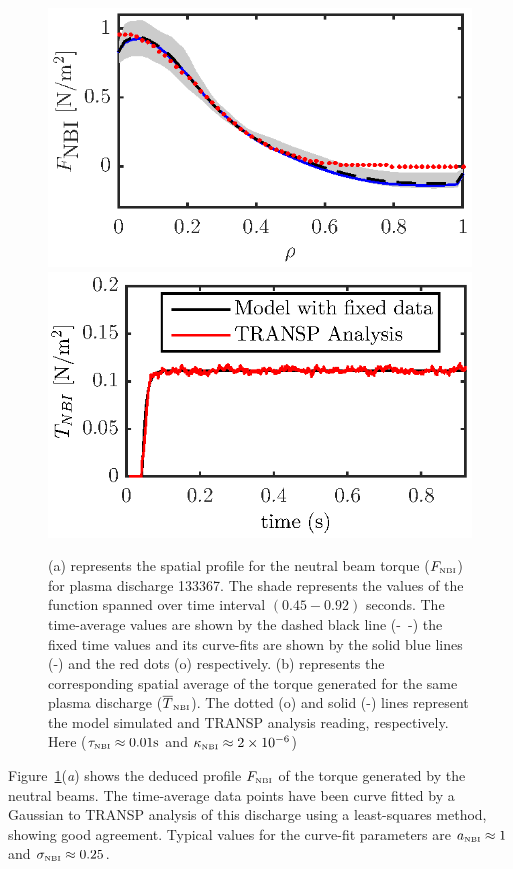 \documentclass[12pt]{iopart}
\begin{document}
\begin{figure}
\includegraphics{imene_figs/fig4a} \hspace{-2.7em} \\[-1em] %
\includegraphics{imene_figs/fig4b} \hspace{-2.7em}          %
\caption{(a) represents the spatial profile for the neutral beam torque ($F_\textrm{\tiny{NBI}} $) for plasma discharge 133367.  The shade represents the values of the function spanned over time interval $(0.45-0.92)$ seconds.  The time-average values are shown by the dashed black line (-~-) the fixed time values and its curve-fits are shown by the solid blue lines (-) and the red dots (o) respectively. (b) represents the corresponding spatial average of the torque generated for the same plasma discharge ($ \overline{T}_\textrm{\tiny{NBI}}$). The dotted (o) and  solid (-) lines represent the model simulated and TRANSP analysis reading, respectively.  Here ($\tau_\textrm{\tiny{NBI}} \approx 0.01 \textrm{s}$ and $\kappa_\textrm{\tiny{NBI}} \approx 2\times10^{-6} $)}
\label{fig:Fnbi}
\end{figure}
Figure~{\ref{fig:Fnbi}}(\emph{a}) shows the deduced profile $F_\textrm{\tiny{NBI}}$ of the torque generated by the neutral beams. The time-average data points have been curve fitted by a Gaussian to TRANSP analysis of this discharge using a least-squares method, showing good agreement.  Typical values for the curve-fit parameters are $a_\textrm{\tiny{NBI}} \approx 1$ and $\sigma_\textrm{\tiny{NBI}} \approx 0.25$.
\end{document}
